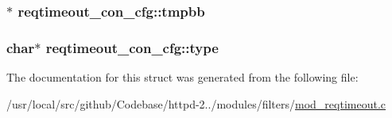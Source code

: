 \subsubsection[{\texorpdfstring{tmpbb}{tmpbb}}]{$\ast$ reqtimeout\+\_\+con\+\_\+cfg\+::tmpbb}\hypertarget{structreqtimeout__con__cfg_aa59322be932addcb0bb97d1277c989cb}{}\label{structreqtimeout__con__cfg_aa59322be932addcb0bb97d1277c989cb}
\subsubsection[{\texorpdfstring{type}{type}}]{\setlength{\rightskip}{0pt plus 5cm}char$\ast$ reqtimeout\+\_\+con\+\_\+cfg\+::type}\hypertarget{structreqtimeout__con__cfg_a50cb12172d0b5ec5788456e88dec8f94}{}\label{structreqtimeout__con__cfg_a50cb12172d0b5ec5788456e88dec8f94}


The documentation for this struct was generated from the following file\+:\begin{DoxyCompactItemize}
\item 
/usr/local/src/github/\+Codebase/httpd-\/2../modules/filters/\hyperlink{mod__reqtimeout_8c}{mod\+\_\+reqtimeout.\+c}\end{DoxyCompactItemize}
